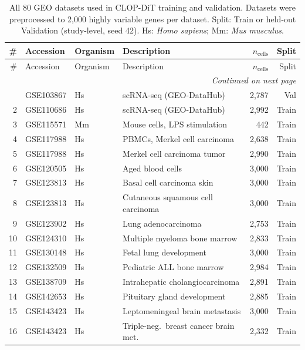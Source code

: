 \documentclass[fleqn,10pt,lineno]{wlpeerj}
\begin{document}
{\footnotesize
\renewcommand{\arraystretch}{0.9}
\begin{longtable}{rllp{4.2cm}rr}
\caption{All 80 GEO datasets used in CLOP-DiT training and validation. Datasets were preprocessed to 2,000 highly variable genes per dataset. Split: Train or held-out Validation (study-level, seed 42). Hs: \textit{Homo sapiens}; Mm: \textit{Mus musculus}.\label{tab:s1_datasets}} \\
\toprule
\# & Accession & Organism & Description & $n_{\text{cells}}$ & Split \\
\midrule
\endfirsthead
\toprule
\# & Accession & Organism & Description & $n_{\text{cells}}$ & Split \\
\midrule
\endhead
\midrule
\multicolumn{6}{r}{\textit{Continued on next page}} \\
\endfoot
\bottomrule
\endlastfoot
  1 & GSE103867 & Hs & scRNA-seq (GEO-DataHub) & 2,787 & Val \\
  2 & GSE110686 & Hs & scRNA-seq (GEO-DataHub) & 2,992 & Train \\
  3 & GSE115571 & Mm & Mouse cells, LPS stimulation & 442 & Train \\
  4 & GSE117988 & Hs & PBMCs, Merkel cell carcinoma & 2,638 & Train \\
  5 & GSE117988 & Hs & Merkel cell carcinoma tumor & 2,990 & Train \\
  6 & GSE120505 & Hs & Aged blood cells & 3,000 & Train \\
  7 & GSE123813 & Hs & Basal cell carcinoma skin & 3,000 & Train \\
  8 & GSE123813 & Hs & Cutaneous squamous cell carcinoma & 3,000 & Train \\
  9 & GSE123902 & Hs & Lung adenocarcinoma & 2,753 & Train \\
  10 & GSE124310 & Hs & Multiple myeloma bone marrow & 2,833 & Train \\
  11 & GSE130148 & Hs & Fetal lung development & 3,000 & Train \\
  12 & GSE132509 & Hs & Pediatric ALL bone marrow & 2,984 & Train \\
  13 & GSE138709 & Hs & Intrahepatic cholangiocarcinoma & 2,891 & Train \\
  14 & GSE142653 & Hs & Pituitary gland development & 2,885 & Train \\
  15 & GSE143423 & Hs & Leptomeningeal brain metastasis & 3,000 & Train \\
  16 & GSE143423 & Hs & Triple-neg.\ breast cancer brain met. & 2,332 & Train \\

\end{longtable}}
\end{document}
